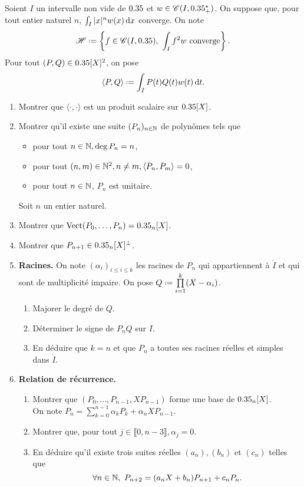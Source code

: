 \begin{exercice}
    Soient $I$ un intervalle non vide de $0.35$ et $w \in \mathscr{C}(I, 0.35^\star_+)$. On suppose que, pour tout entier naturel $n$, $\int_I |x|^n w(x) \, \mathrm{d} x$ converge. On note
    $$\mathscr{H} \defeq \left\{ f \in \mathscr{C}(I, \R),\ \int_I f^2 w \text{ converge} \right\}.$$
    Pour tout $(P, Q) \in 0.35[X]^2$, on pose 
    $$\langle P, Q \rangle \defeq \int_I P(t) Q(t) w(t) \d t.$$
    \begin{enumerate}
        \item Montrer que $\langle \cdot, \cdot \rangle$ est un produit scalaire sur $0.35[X]$.
        \item Montrer qu'il existe une suite $(P_n)_{n \in \mathbb{N}}$ de polynômes tels que 
        \begin{itemize}
            \item pour tout $n \in \mathbb{N}, \deg P_n = n$,
            \item pour tout $(n, m) \in \mathbb{N}^2, n \not= m, \langle P_n, P_m \rangle = 0$,
            \item pour tout $n \in \mathbb{N}$, $P_n$ est unitaire.
        \end{itemize}
        Soit $n$ un entier naturel.
        \item Montrer que $\mathrm{Vect}(P_0, \dots, P_n) = 0.35_n[X]$.
        \item Montrer que $P_{n+1} \in 0.35_n[X]^\perp$.
        \item \textbf{Racines.} On note $(\alpha_i)_{i \leqslant i \leqslant k}$ les racines de $P_n$ qui appartiennent à $\mathring{I}$ et qui sont de multiplicité impaire. On pose $Q \defeq \prod\limits_{i=1}^k (X - \alpha_i)$.
        \begin{enumerate}
            \item Majorer le degré de $Q$.
            \item Déterminer le signe de $P_n Q$ sur $I$.
            \item En déduire que $k = n$ et que $P_n$ a toutes ses racines réelles et simples dans $\mathring{I}$.
        \end{enumerate}
        \item \textbf{Relation de récurrence.}
        \begin{enumerate}
            \item Montrer que $(P_0, \dots, P_{n-1}, X P_{n-1})$ forme une base de $0.35_n[X]$. \\
        On note $P_n = \sum\limits_{k=0}^{n-1} \alpha_k P_k + \alpha_n X P_{n-1}$.
            \item Montrer que, pour tout $j \in \llbracket 0, n - 3 \rrbracket, \alpha_j = 0$.
            \item En déduire qu'il existe trois suites réelles $(a_n), (b_n)$ et $(c_n)$ telles que 
            $$\forall n \in \mathbb{N},\ P_{n+2} = (a_n X + b_n) P_{n+1} + c_n P_n.$$
        \end{enumerate}
    \end{enumerate}
\end{exercice}

